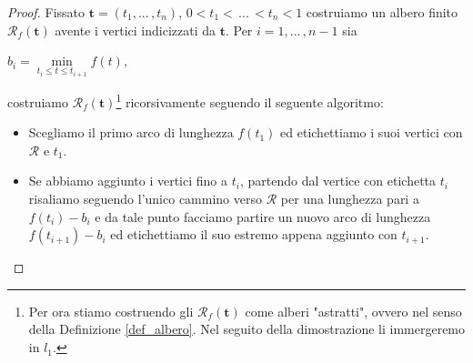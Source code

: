 \documentclass[11pt, twoside]{report}
\newcommand{\Rr}{\mathscr{R}}
\theoremstyle{definition}
\theoremstyle{plain}
\theoremstyle{remark}
\newtheorem{oss}{Osservazione}[chapter]
\numberwithin{equation}{chapter}
\begin{document}
\begin{proof}
Fissato $\mathbf{t}=(t_1, ...\, ,t_n)$, $0<t_1<\, ... \, <t_n<1$ costruiamo un albero finito $\Rr_f(\mathbf{t})$ avente i vertici indicizzati da $\mathbf{t}$. Per $i=1, ... \, ,n-1$ sia
\begin{center}
 $b_i= \min\limits_{t_i\leq t\leq t_{i+1}} f(t)$,
\end{center}
costruiamo $\Rr_f(\mathbf{t})$\footnote{Per ora stiamo costruendo gli $\Rr_f(\mathbf{t})$ come alberi "astratti", ovvero nel senso della Definizione \ref{def_albero}. Nel seguito della dimostrazione li immergeremo in $l_1$.} ricorsivamente seguendo il seguente algoritmo:
\begin{itemize}
\item Scegliamo il primo arco di lunghezza $f(t_1)$ ed etichettiamo i suoi vertici con $\mathcal{R}$ e $t_1$.

\item Se abbiamo aggiunto i vertici fino a $t_i$, partendo dal vertice con etichetta $t_i$ risaliamo seguendo l'unico cammino verso $\mathcal{R}$ per una lunghezza pari a $f(t_i)-b_i$ e da tale punto facciamo partire un nuovo arco di lunghezza $f(t_{i+1})-b_i$ ed etichettiamo il suo estremo appena aggiunto con $t_{i+1}$.
\end{itemize}



\end{proof}
\end{document}
